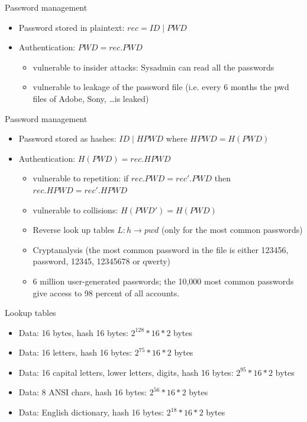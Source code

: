 \documentclass{beamer}
\begin{document}
\begin{frame}{Password management}
  \begin{itemize}
    \item Password stored in plaintext: $rec = ID \mid PWD$
    \item Authentication: $PWD = rec.PWD$
      \begin{itemize}
        \item<2-> vulnerable to insider attacks: Sysadmin can read all the passwords
        \item<3-> vulnerable to leakage of the password file (i.e. every 6 months the pwd files of
          Adobe, Sony, \dots is leaked)
      \end{itemize}
  \end{itemize}
\end{frame}

\begin{frame}{Password management}
  \begin{itemize}
    \item Password stored as hashes: $ID \mid HPWD$ where $HPWD=H(PWD)$ 
    \item Authentication: $H(PWD) = rec.HPWD$
      \begin{itemize}
        \item<1-> vulnerable to repetition: if $rec.PWD = rec'.PWD$ then $rec.HPWD = rec'.HPWD$
        \item<2-> vulnerable to collisions: $H(PWD')=H(PWD)$
        \item<3-> Reverse look up tables $L: h \rightarrow pwd$ (only for the most common passwords)
        \item<4-> Cryptanalysis (the most common password in the file is either 123456, password, 12345, 12345678 or qwerty)
        \item<5-> 6 million user-generated passwords; the 10,000 most common passwords give access to 98 percent of all accounts. 
      \end{itemize}
  \end{itemize}
\end{frame}


\begin{frame}{Lookup tables}
  \begin{itemize}
    \item Data: 16 bytes, hash 16 bytes: $2^{128}*16*2$ bytes 
    \item Data: 16 letters, hash 16 bytes: $2^{75}*16*2$ bytes
    \item Data: 16 capital letters, lower letters, digits, hash 16 bytes: $2^{95}*16*2$ bytes
    \item Data: 8 ANSI chars, hash 16 bytes: $2^{56}*16*2$ bytes
    \item Data: English dictionary, hash 16 bytes: $2^{18}*16*2$ bytes
  \end{itemize}
\end{frame}
\end{document}
